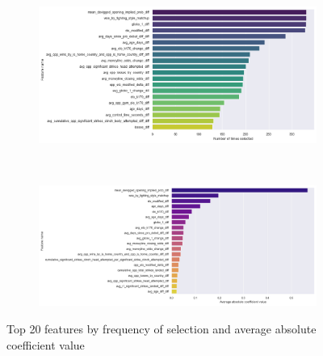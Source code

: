 \documentclass[12pt,twoside]{report}
\begin{document}
\begin{figure}[!htb]
\centering
\captionsetup{justification=centering}
\begin{subfigure}{\linewidth}
  \centering
  \includegraphics[width=\linewidth]{figures/lr_feature_selection_freq.png}
\end{subfigure}\\
\begin{subfigure}{\linewidth}
  \centering
  \includegraphics[width=\linewidth]{figures/lr_feature_avg_abs_coef.png}
\end{subfigure}
\caption{Top 20 features by frequency of selection and average absolute coefficient value}
\label{feature_importances}
\end{figure}
\end{document}
